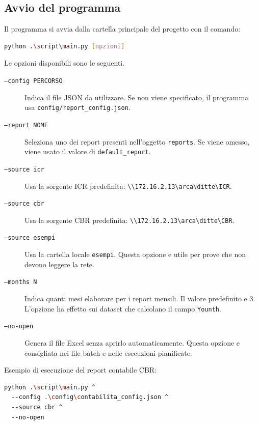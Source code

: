 \subsection{Avvio del programma}

Il programma si avvia dalla cartella principale del progetto con il comando:

\begin{lstlisting}[language=bash]
python .\script\main.py [opzioni]
\end{lstlisting}

Le opzioni disponibili sono le seguenti.

\begin{description}
  \item[\texttt{--config PERCORSO}]
  Indica il file JSON da utilizzare. Se non viene specificato, il programma
  usa \texttt{config/report\_config.json}.

  \item[\texttt{--report NOME}]
  Seleziona uno dei report presenti nell'oggetto \texttt{reports}. Se viene
  omesso, viene usato il valore di \texttt{default\_report}.

  \item[\texttt{--source icr}]
  Usa la sorgente ICR predefinita:
  \texttt{\textbackslash\textbackslash172.16.2.13\textbackslash arca\textbackslash ditte\textbackslash ICR}.

  \item[\texttt{--source cbr}]
  Usa la sorgente CBR predefinita:
  \texttt{\textbackslash\textbackslash172.16.2.13\textbackslash arca\textbackslash ditte\textbackslash CBR}.

  \item[\texttt{--source esempi}]
  Usa la cartella locale \texttt{esempi}. Questa opzione e utile per prove
  che non devono leggere la rete.

  \item[\texttt{--months N}]
  Indica quanti mesi elaborare per i report mensili. Il valore predefinito e
  3. L'opzione ha effetto sui dataset che calcolano il campo \texttt{Younth}.

  \item[\texttt{--no-open}]
  Genera il file Excel senza aprirlo automaticamente. Questa opzione e
  consigliata nei file batch e nelle esecuzioni pianificate.
\end{description}

Esempio di esecuzione del report contabile CBR:

\begin{lstlisting}[language=bash]
python .\script\main.py ^
  --config .\config\contabilita_config.json ^
  --source cbr ^
  --no-open
\end{lstlisting}

